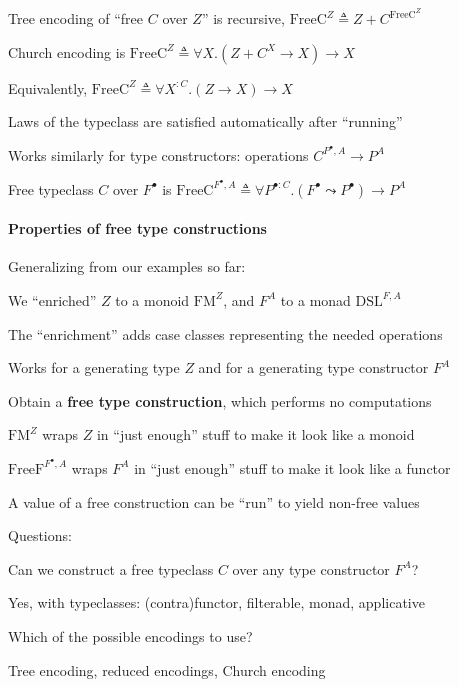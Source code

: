 Tree encoding of \textsf{``}free $C$ over $Z$\textsf{''} is recursive, $\text{FreeC}^{Z}\triangleq Z+C^{\text{FreeC}^{Z}}$

Church encoding is $\text{FreeC}^{Z}\triangleq\forall X.\left(Z+C^{X}\rightarrow X\right)\rightarrow X$

Equivalently, $\text{FreeC}^{Z}\triangleq\forall X^{:C}.\left(Z\rightarrow X\right)\rightarrow X$

Laws of the typeclass are satisfied automatically after \textsf{``}running\textsf{''}

Works similarly for type constructors: operations $C^{P^{\bullet},A}\rightarrow P^{A}$

Free typeclass $C$ over $F^{\bullet}$ is $\text{FreeC}^{F^{\bullet},A}\triangleq\forall P^{\bullet:C}.\left(F^{\bullet}\leadsto P^{\bullet}\right)\rightarrow P^{A}$

\paragraph{Properties of free type constructions}

Generalizing from our examples so far:

We \textsf{``}enriched\textsf{''} $Z$ to a monoid $\text{FM}^{Z}$, and $F^{A}$
to a monad $\text{DSL}^{F,A}$ 

The \textsf{``}enrichment\textsf{''} adds case classes representing the needed operations

Works for a generating type $Z$ and for a generating type constructor
$F^{A}$

Obtain a \textbf{free type construction}, which performs no computations

$\text{FM}^{Z}$ wraps $Z$ in \textsf{``}just enough\textsf{''} stuff to make it
look like a monoid

$\text{FreeF}^{F^{\bullet},A}$ wraps $F^{A}$ in \textsf{``}just enough\textsf{''}
stuff to make it look like a functor

A value of a free construction can be \textsf{``}run\textsf{''} to yield non-free
values 

Questions:

Can we construct a free typeclass $C$ over any type constructor $F^{A}$?

Yes, with typeclasses: (contra)functor, filterable, monad, applicative

Which of the possible encodings to use?

Tree encoding, reduced encodings, Church encoding

